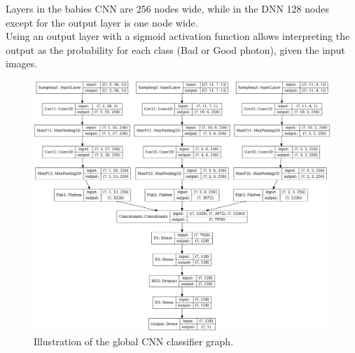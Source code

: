 Layers in the babies CNN are 256 nodes wide, while in the DNN 128 nodes except for the output layer is one node wide.\\
Using an output layer with a sigmoid activation function allows interpreting the output as the probability for each class (Bad or Good photon), given the input images.\\
\begin{figure}[htbp]
    \centering
    \includegraphics[width=1.\textwidth]{Ch3/Img/CNN_model.png}
    \begin{tcolorbox}[colback=black!5!white,colframe=white!75!black]
    \caption{Illustration of the global CNN classifier graph.}
    \label{fig:gamma:CNN:Model:Arch}
    \end{tcolorbox}
    
\end{figure}
